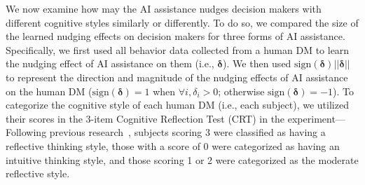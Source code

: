 \documentclass[letterpaper]{article} %
\begin{document}
We now examine how may the AI assistance nudges decision makers with different cognitive styles similarly or differently.  To do so, we compared the size of the learned nudging effects on decision makers for three forms of AI assistance. Specifically, we first used all behavior data collected from a human DM to learn the nudging effect of AI assistance on them (i.e., $\bm{\delta}$).
We then used $\text{sign}(\bm{\delta})||\bm{\delta}||$ to represent the direction and magnitude of the nudging effects of AI assistance on the human DM ($\text{sign}(\bm{\delta})=1$ when $\forall i, \delta_i>0$; otherwise $\text{sign}(\bm{\delta})=-1$).
To categorize the cognitive style of each human DM (i.e., each subject), we utilized
their scores in the 3-item Cognitive Reflection Test (CRT) in the experiment---Following previous research~\cite{Frederick2005CognitiveRA}, subjects scoring 3 were classified as having a reflective thinking style, those with a score of 0 were categorized as having an intuitive thinking style, and those scoring 1 or 2 were categorized as the moderate reflective style.

\end{document}
